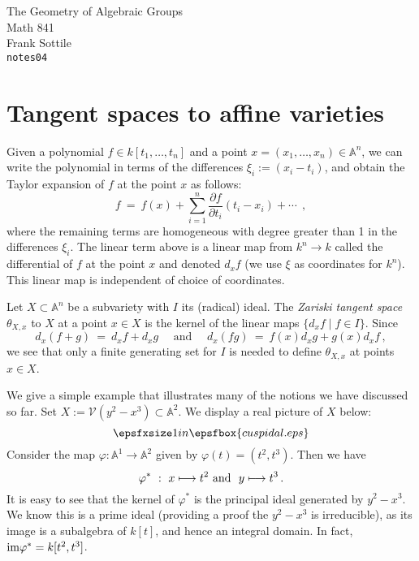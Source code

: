 \documentclass[12pt]{amsart}
\def\silentfootnote#1{{\let\thefootnote\relax\footnotetext{#1}}}
\begin{document}
\begin{center}
\Large
The Geometry of Algebraic Groups\\
\large
Math 841\\
Frank Sottile\\
{\tt notes04}
\end{center}\bigskip

\silentfootnote{\sl Version of 18 February 2000} 

\section{Tangent spaces to affine varieties}

Given a polynomial $f\in k[t_1,\ldots,t_n]$ and a point 
$x=(x_1,\ldots,x_n)\in{\mathbb A}^n$, we can write the polynomial in terms
of the differences $\xi_i:=(x_i-t_i)$, and obtain the Taylor expansion 
of $f$ at the point $x$ as follows:
$$
   f\ =\  f(x) + 
   \sum_{i=1}^n \frac{\partial f}{\partial t_i}(t_i-x_i) + \cdots\ \ ,
$$
where the remaining terms are homogeneous with degree greater than 1 in
the differences $\xi_i$.
The linear term above is a linear map from $k^n\to k$ called the
differential of $f$ at the point $x$ and denoted $d_xf$
(we use $\xi$ as coordinates for $k^n$).
This linear map is independent of choice of coordinates.\smallskip

Let $X\subset {\mathbb A}^n$ be a subvariety with $I$ its (radical) ideal.
The {\sl Zariski tangent space} $\theta_{X,x}$ to $X$ at a point $x\in X$
is the kernel of the linear maps $\{d_xf\mid f\in I\}$.
Since 
$$
  d_x(f+g)\ =\ d_xf + d_xg 
  \quad\mbox{ and }\quad
  d_x(fg)\ =\ f(x)d_xg + g(x)d_xf\,,
$$ 
we see that only a finite generating set for $I$ is needed to define
$\theta_{X,x}$ at points $x\in X$.
\medskip

We give a simple example that illustrates many of the notions we have
discussed so far.
Set $X:={\mathcal V}(y^2-x^3)\subset{\mathbb A}^2$.
We display a real picture of $X$ below:
$$
  \epsfxsize 1in\epsfbox{cuspidal.eps}
$$
Consider the map $\varphi:{\mathbb A}^1\to{\mathbb A}^2$ given by 
$\varphi(t)=(t^2,t^3)$.
Then we have
$$
  \varphi^*\ :\ x\longmapsto t^2 \ \mbox{\rm and }\ 
                y\longmapsto t^3\,.
$$
It is easy to see that the kernel of $\varphi^*$ is the principal ideal
generated by $y^2-x^3$.
We know this is a prime ideal (providing a proof the $y^2-x^3$ is
irreducible), as its image is a subalgebra of $k[t]$,
and hence an integral domain.
In fact, ${\rm im}\varphi^*= k[t^2,t^3]$.
\end{document}
